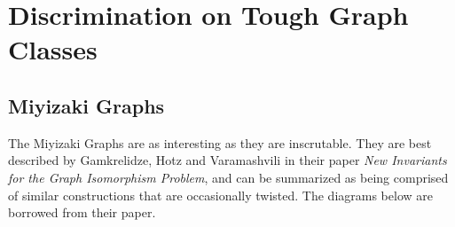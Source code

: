 %
%
%

\section{Discrimination on Tough Graph Classes}

\subsection{Miyizaki Graphs}
The Miyizaki Graphs are as interesting as they are inscrutable.
They are best described by Gamkrelidze, Hotz and Varamashvili in their paper \emph{New Invariants for the Graph Isomorphism Problem}, and can be summarized as being comprised of similar constructions that are occasionally twisted.
The diagrams below are borrowed from their paper.

